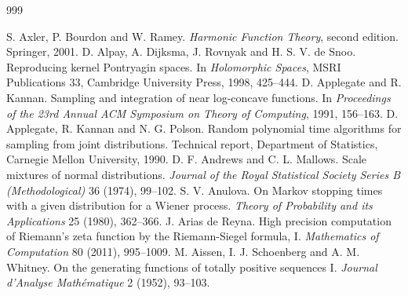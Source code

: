 \begin{thebibliography}{999}\small\setlength{\itemsep}{0pt}\setlength{\parsep}{0pt}\setlength{\parskip}{0pt}

 S. Axler, P. Bourdon and W. Ramey. \emph{Harmonic Function Theory}, second edition. Springer, 2001.
 D. Alpay, A. Dijksma, J. Rovnyak and H. S. V. de Snoo. Reproducing kernel Pontryagin spaces. In \emph{Holomorphic Spaces}, MSRI Publications 33, Cambridge University Press, 1998, 425--444.
 D. Applegate and R. Kannan. Sampling and integration of near log-concave functions. In \emph{Proceedings of the 23rd Annual ACM Symposium on Theory of Computing}, 1991, 156--163.
 D. Applegate, R. Kannan and N. G. Polson. Random polynomial time algorithms for sampling from joint distributions. Technical report, Department of Statistics, Carnegie Mellon University, 1990.
 D. F. Andrews and C. L. Mallows. Scale mixtures of normal distributions. \emph{Journal of the Royal Statistical Society Series B (Methodological)} 36 (1974), 99--102.
 S. V. Anulova. On Markov stopping times with a given distribution for a Wiener process. \emph{Theory of Probability and its Applications} 25 (1980), 362--366.
 J. Arias de Reyna. High precision computation of Riemann's zeta function by the Riemann-Siegel formula, I. \emph{Mathematics of Computation} 80 (2011), 995--1009.
 M. Aissen, I. J. Schoenberg and A. M. Whitney. On the generating functions of totally positive sequences I. \emph{Journal d'Analyse Math\'ematique} 2 (1952), 93--103.

\end{thebibliography}
